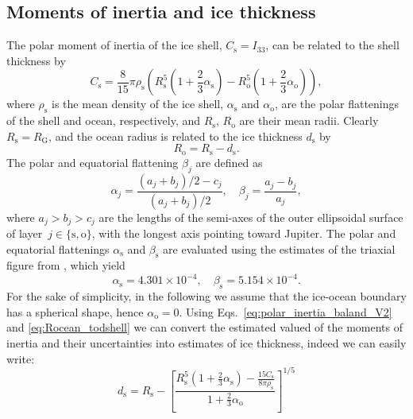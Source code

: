 \documentclass[pdflatex,sn-mathphys-num]{sn-jnl}%
\theoremstyle{thmstyleone}%
\theoremstyle{thmstyletwo}%
\theoremstyle{thmstylethree}%
\begin{document}
\subsection{Moments of inertia and ice thickness}\label{sec:moi_shell_thickness}

The polar moment of inertia of the ice shell, ${C_{\mathrm{s}} = I_{33}}$, can be related to the shell thickness by
\begin{equation} \label{eq:polar_inertia_baland_V2}
        C_{\mathrm{s}} =
        \frac{8}{15} \pi \rho_\mathrm{s}
        \left(
                R_\mathrm{s}^5 \left(1 + \frac{2}{3}\alpha_\mathrm{s} \right) - 
                R_{\mathrm{o}}^5 \left(1 + \frac{2}{3} \alpha_\mathrm{o} \right)
        \right),
\end{equation}
where $\rho_\mathrm{s}$ is the mean density of the ice shell, $\alpha_{\mathrm{s}}$ and $\alpha_{\mathrm{o}}$, are the polar flattenings of the shell and ocean, respectively, and $R_{\mathrm{s}}$, $R_{\mathrm{o}}$ are their mean radii.
Clearly ${R_{\mathrm{s}} = R_{\mathrm{G}}}$, and the ocean radius is related to the ice thickness $ d_{\mathrm{s}}$ by 
\begin{equation}\label{eq:Rocean_todshell}
	R_{\mathrm{o}} = R_{\mathrm{s}} - d_{\mathrm{s}}.
\end{equation}
The polar and equatorial flattening $\beta_j$ are defined as
\begin{equation}
         \alpha_j = \frac{ (a_j+b_j)/2 -c_j}{ (a_j+b_j)/2}, \quad \beta_j = \frac{a_j-b_j}{a_j},
\end{equation}
where ${a_j>b_j>c_j}$ are the lengths of the semi-axes of the outer ellipsoidal surface of layer~$j\in\{\mathrm{s,o}\}$, with the longest axis pointing toward Jupiter.
The polar and equatorial flattenings $\alpha_\mathrm{s}$ and $\beta_\mathrm{s}$ are evaluated using the estimates of the triaxial figure from \citet{1997AGGH...32..225B}, which yield
\begin{equation}
        \alpha_\mathrm{s} = 4.301 \times 10^{-4}, \quad \beta_\mathrm{s} = 5.154 \times 10^{-4}.
\end{equation}
%
For the sake of simplicity, in the following we assume that
the ice-ocean boundary has a spherical shape, hence ${\alpha_\mathrm{o} = 0}$.
%
%
Using Eqs.~\eqref{eq:polar_inertia_baland_V2} and \eqref{eq:Rocean_todshell} we can convert the estimated valued of the moments of inertia and their uncertainties into estimates of ice thickness, indeed we can easily write:
\begin{equation} \label{eq:ice_shell_thickness}
    d_{\mathrm{s}} = R_{\mathrm{s}} - \left[ \frac{ R_{\mathrm{s}}^5 \left(1 + \frac{2}{3}\alpha_{\mathrm{s}} \right) - \frac{15 C_{\mathrm{s}}}{8 \pi \rho_{\mathrm{s}}} }{ 1 + \frac{2}{3} \alpha_{\mathrm{o}} } \right]^{1/5}
\end{equation}
\end{document}
